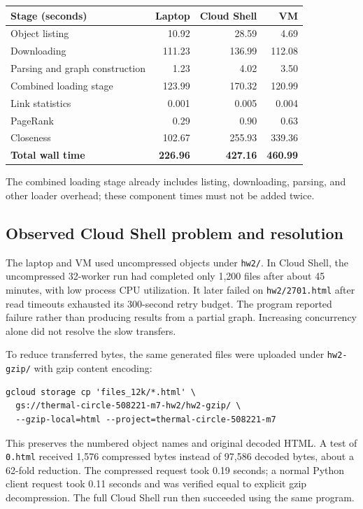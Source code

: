 \documentclass[10pt,letterpaper]{article}
\begin{document}
\begin{tabularx}{\linewidth}{@{}Yrrr@{}}
\toprule Stage (seconds) & Laptop & Cloud Shell & VM \\ \midrule
Object listing & 10.92 & 28.59 & 4.69 \\
Downloading & 111.23 & 136.99 & 112.08 \\
Parsing and graph construction & 1.23 & 4.02 & 3.50 \\
Combined loading stage & 123.99 & 170.32 & 120.99 \\
Link statistics & 0.001 & 0.005 & 0.004 \\
PageRank & 0.29 & 0.90 & 0.63 \\
Closeness & 102.67 & 255.93 & 339.36 \\
\textbf{Total wall time} & \textbf{226.96} & \textbf{427.16} & \textbf{460.99} \\
\bottomrule
\end{tabularx}
The combined loading stage already includes listing, downloading, parsing,
and other loader overhead; these component times must not be added twice.

\subsection{Observed Cloud Shell problem and resolution}
The laptop and VM used uncompressed objects under \texttt{hw2/}. In Cloud Shell,
the uncompressed 32-worker run had completed only 1,200 files after about
45 minutes, with low process CPU utilization. It later failed on
\texttt{hw2/2701.html} after read timeouts exhausted its 300-second retry budget.
The program reported failure rather than producing results from a partial graph.
Increasing concurrency alone did not resolve the slow transfers.

To reduce transferred bytes, the same generated files were uploaded under
\texttt{hw2-gzip/} with gzip content encoding:
\begin{lstlisting}
gcloud storage cp 'files_12k/*.html' \
  gs://thermal-circle-508221-m7-hw2/hw2-gzip/ \
  --gzip-local=html --project=thermal-circle-508221-m7
\end{lstlisting}
This preserves the numbered object names and original decoded HTML. A test of
\texttt{0.html} received 1,576 compressed bytes instead of 97,586 decoded bytes,
about a 62-fold reduction. The compressed request took 0.19 seconds; a normal
Python client request took 0.11 seconds and was verified equal to explicit gzip
decompression. The full Cloud Shell run then succeeded using the same program.
\end{document}
